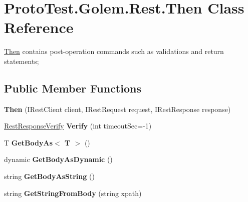 \hypertarget{class_proto_test_1_1_golem_1_1_rest_1_1_then}{\section{Proto\-Test.\-Golem.\-Rest.\-Then Class Reference}
\label{class_proto_test_1_1_golem_1_1_rest_1_1_then}
}


\hyperlink{class_proto_test_1_1_golem_1_1_rest_1_1_then}{Then} contains post-\/operation commands such as validations and return statements;  


\subsection*{Public Member Functions}
\begin{DoxyCompactItemize}
\item 
\hypertarget{class_proto_test_1_1_golem_1_1_rest_1_1_then_a22151bad6f82c8c91ad2ce531cf48b6b}{{\bfseries Then} (I\-Rest\-Client client, I\-Rest\-Request request, I\-Rest\-Response response)}\label{class_proto_test_1_1_golem_1_1_rest_1_1_then_a22151bad6f82c8c91ad2ce531cf48b6b}

\item 
\hypertarget{class_proto_test_1_1_golem_1_1_rest_1_1_then_ac060f8e3c5dda77b7b30f4f855e4d41d}{\hyperlink{class_proto_test_1_1_golem_1_1_rest_1_1_rest_response_verify}{Rest\-Response\-Verify} {\bfseries Verify} (int timeout\-Sec=-\/1)}\label{class_proto_test_1_1_golem_1_1_rest_1_1_then_ac060f8e3c5dda77b7b30f4f855e4d41d}

\item 
\hypertarget{class_proto_test_1_1_golem_1_1_rest_1_1_then_a1d7031ddade99330337befc689b0f050}{T {\bfseries Get\-Body\-As$<$ T $>$} ()}\label{class_proto_test_1_1_golem_1_1_rest_1_1_then_a1d7031ddade99330337befc689b0f050}

\item 
\hypertarget{class_proto_test_1_1_golem_1_1_rest_1_1_then_ad100791ac7d45e9c88d740bae0f5e2c6}{dynamic {\bfseries Get\-Body\-As\-Dynamic} ()}\label{class_proto_test_1_1_golem_1_1_rest_1_1_then_ad100791ac7d45e9c88d740bae0f5e2c6}

\item 
\hypertarget{class_proto_test_1_1_golem_1_1_rest_1_1_then_ab8f949614049eb7286447adb0307a5c1}{string {\bfseries Get\-Body\-As\-String} ()}\label{class_proto_test_1_1_golem_1_1_rest_1_1_then_ab8f949614049eb7286447adb0307a5c1}

\item 
\hypertarget{class_proto_test_1_1_golem_1_1_rest_1_1_then_a29e6066b3da6687f936987a1354519b9}{string {\bfseries Get\-String\-From\-Body} (string xpath)}\label{class_proto_test_1_1_golem_1_1_rest_1_1_then_a29e6066b3da6687f936987a1354519b9}

\end{DoxyCompactItemize}
